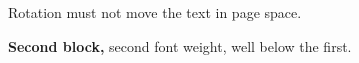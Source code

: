 \documentclass[10pt]{article}
\begin{document}
\noindent Rotation must not move the text in page space.

\vspace{60bp}
\noindent\textbf{Second block,} second font weight, well below the first.
\end{document}
